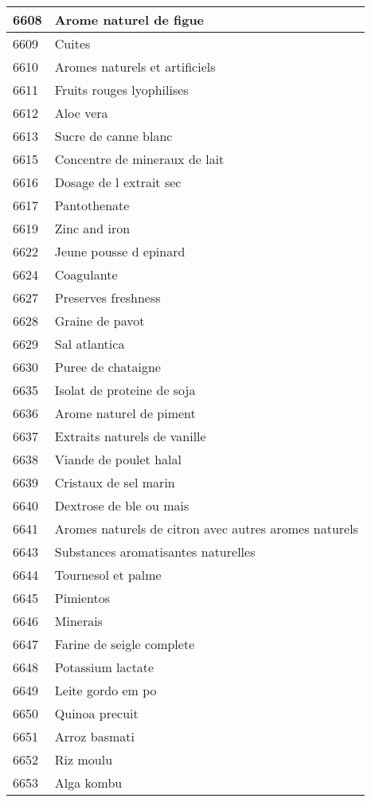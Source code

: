 \begin{longtable}{|l|l|}
6608 & Arome naturel de figue \\ \hline 
6609 & Cuites \\ \hline 
6610 & Aromes naturels et artificiels \\ \hline 
6611 & Fruits rouges lyophilises \\ \hline 
6612 & Aloe vera \\ \hline 
6613 & Sucre de canne blanc \\ \hline 
6615 & Concentre de mineraux de lait \\ \hline 
6616 & Dosage de l extrait sec \\ \hline 
6617 & Pantothenate \\ \hline 
6619 & Zinc and iron \\ \hline 
6622 & Jeune pousse d epinard \\ \hline 
6624 & Coagulante \\ \hline 
6627 & Preserves freshness \\ \hline 
6628 & Graine de pavot \\ \hline 
6629 & Sal atlantica \\ \hline 
6630 & Puree de chataigne \\ \hline 
6635 & Isolat de proteine de soja \\ \hline 
6636 & Arome naturel de piment \\ \hline 
6637 & Extraits naturels de vanille \\ \hline 
6638 & Viande de poulet halal \\ \hline 
6639 & Cristaux de sel marin \\ \hline 
6640 & Dextrose de ble ou mais \\ \hline 
6641 & Aromes naturels de citron avec autres aromes naturels \\ \hline 
6643 & Substances aromatisantes naturelles \\ \hline 
6644 & Tournesol et palme \\ \hline 
6645 & Pimientos \\ \hline 
6646 & Minerais \\ \hline 
6647 & Farine de seigle complete \\ \hline 
6648 & Potassium lactate \\ \hline 
6649 & Leite gordo em po \\ \hline 
6650 & Quinoa precuit \\ \hline 
6651 & Arroz basmati \\ \hline 
6652 & Riz moulu \\ \hline 
6653 & Alga kombu \\ \hline 

\end{longtable}
